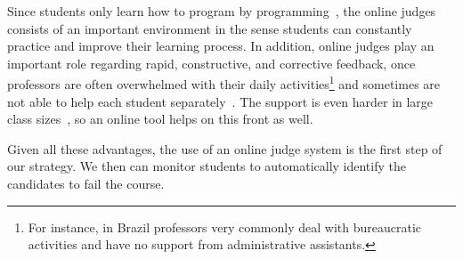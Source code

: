Since students only learn how to program by programming~\cite{jenkins-ltsn02}, the online judges consists of an important environment in the sense students can constantly practice and improve their learning process. In addition, online judges play an important role regarding rapid, constructive, and corrective feedback, once professors are often overwhelmed with their daily activities\footnote{For instance, in Brazil professors very commonly deal with bureaucratic activities and have no support from administrative assistants.} and sometimes are not able to help each student separately~\cite{autolep-2011}. The support is even harder in large class sizes~\cite{autolep-2011}, so an online tool helps on this front as well.


Given all these advantages, the use of an online judge system is the first step of our strategy. We then can monitor students to automatically identify the candidates to fail the course.




